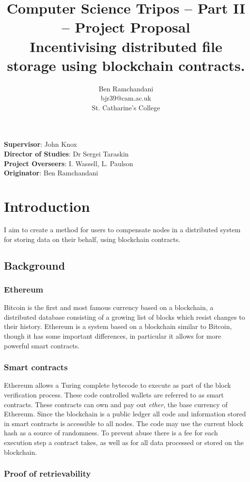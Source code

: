 \documentclass[oneside]{article}
\title{
{\Large Computer Science Tripos -- Part II -- Project Proposal}\\
\vspace{1em}
Incentivising distributed file storage using blockchain contracts.}
\author{Ben Ramchandani \\ bjr39@cam.ac.uk \\ St. Catharine's College}
\begin{document}
\maketitle

\textbf{Supervisor}: John Knox\\
\textbf{Director of Studies}: Dr Sergei Taraskin\\
\textbf{Project Overseers}: I. Wassell, L. Paulson\\
\textbf{Originator}: Ben Ramchandani


\section{Introduction}

I aim to create a method for users to compensate nodes in a distributed system for storing data on their behalf, using blockchain contracts.

\subsection{Background}
\subsubsection{Ethereum}

Bitcoin is the first and most famous currency based on a blockchain, a distributed database consisting of a growing list of blocks which resist changes to their history.
Ethereum is a system based on a blockchain similar to Bitcoin, though it has some important differences, in particular it allows for more powerful smart contracts.

\subsubsection{Smart contracts}

Ethereum allows a Turing complete bytecode to execute as part of the block verification process.
These code controlled wallets are referred to as smart contracts.
These contracts can own and pay out \textit{ether}, the base currency of Ethereum. 
Since the blockchain is a public ledger all code and information stored in smart contracts is accessible to all nodes.
The code may use the current block hash as a source of randomness.
To prevent abuse there is a fee for each execution step a contract takes, as well as for all data processed or stored on the blockchain.

\subsubsection{Proof of retrievability}
\end{document}
